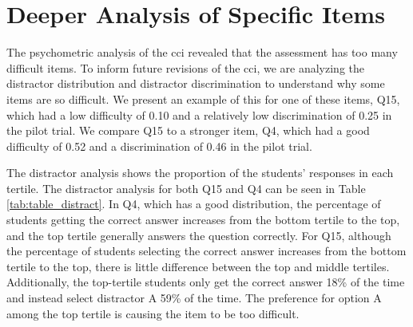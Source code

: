 %

\fi



\FloatBarrier
\section{Deeper Analysis of Specific Items}

The psychometric analysis of the \gls{cci} revealed that the assessment has too many difficult items. To inform future revisions of the \gls{cci}, we are analyzing the distractor distribution and distractor discrimination to understand why some items are so difficult. We present an example of this for one of these items, Q15, which had a low difficulty of 0.10 and a relatively low discrimination of 0.25 in the pilot trial. We compare Q15 to a stronger item, Q4, which had a good difficulty of 0.52 and a discrimination of 0.46 in the pilot trial. 

The distractor analysis shows the proportion of the students' responses in each tertile. The distractor analysis for both Q15 and Q4 can be seen in Table \ref{tab:table_distract}. In Q4, which has a good distribution, the percentage of students getting the correct answer increases from the bottom tertile to the top, and the top tertile generally answers the question correctly. For Q15, although the percentage of students selecting the correct answer increases from the bottom tertile to the top, there is little difference between the top and middle tertiles. Additionally, the top-tertile students only get the correct answer 18\% of the time and instead select distractor A 59\% of the time. The preference for option A among the top tertile is causing the item to be too difficult.

